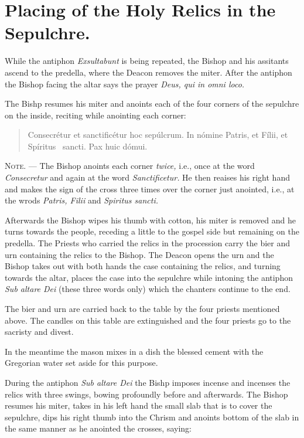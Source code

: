 \documentclass[letterpaper]{report}
\begin{document}
{\section{Placing of the Holy Relics in the Sepulchre.}

\rubric While the antiphon \textit{Exsultabunt} is being repeated, the Bishop
and his assitants ascend to the predella, where the Deacon removes the miter.
After the antiphon the Bishop facing the altar says the prayer \textit{Deus,
qui in omni loco.}

\rubric The Bishp resumes his miter and anoints each of the four corners of the
sepulchre on the inside, reciting while anointing each corner:

\begin{quote}
    Conse\cross crétur et sancti\cross ficétur hoc sepúlcrum. In nómine
    Pa\cross tris, et Fí\cross lii, et Spíritus \cross\ sancti. Pax huic dómui.
\end{quote}

\textsc{Note. ---} The Bishop anoints each corner \textit{twice,} i.e., once at
the word \textit{Consecretur} and again at the word \textit{Sanctificetur.} He
then reaises his right hand and makes the sign of the cross three times over
the corner just anointed, i.e., at the wrods \textit{Patris, Filii} and
\textit{Spiritus sancti.}

\rubric Afterwards the Bishop wipes his thumb with cotton, his miter is removed
and he turns towards the people, receding a little to the gospel side but
remaining on the predella. The Priests who carried the relics in the procession
carry the bier and urn containing the relics to the Bishop. The Deacon opens
the urn and the Bishop takes out with both hands the case containing the
relics, and turning towards the altar, places the case into the sepulchre while
intoning the antiphon \textit{Sub altare Dei} (these three words only) which
the chanters continue to the end.

The bier and urn are carried back to the table by the four priests mentioned
above. The candles on this table are extinguished and the four priests go to
the sacristy and divest.

In the meantime the mason mixes in a dish the blessed cement with the Gregorian
water set aside for this purpose.

\rubric During the antiphon \textit{Sub altare Dei} the Bishp imposes incense
and incenses the relics with three swings, bowing profoundly before and
afterwards. The Bishop resumes his miter, takes in his left hand the small slab
that is to cover the sepulchre, dips his right thumb into the Chrism and
anoints bottom of the slab in the same manner as he anointed the crosses,
saying:

}
\end{document}
